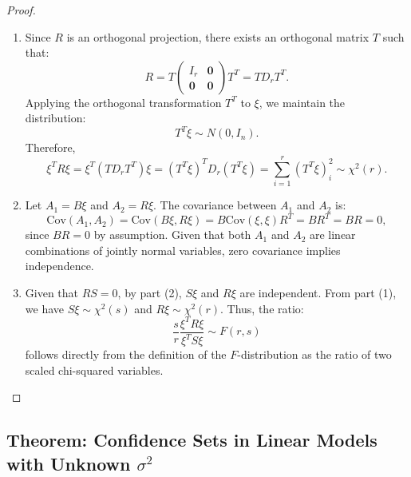 \documentclass[open=any, 11pt,paper=A4]{scrreprt}
\begin{document}
\begin{proof}
\begin{enumerate}
    \item 
    Since \(R\) is an orthogonal projection, there exists an orthogonal matrix \(T\) such that:
    \[
    R = T \begin{pmatrix} I_r & \mathbf{0} \\ \mathbf{0} & \mathbf{0} \end{pmatrix} T^T = T D_r T^T.
    \]
    Applying the orthogonal transformation \(T^T\) to \(\xi\), we maintain the distribution:
    \[
    T^T \xi \sim N(0, I_n).
    \]
    Therefore,
    \[
    \xi^T R \xi = \xi^T (T D_r T^T) \xi = (T^T \xi)^T D_r (T^T \xi) = \sum_{i=1}^{r} (T^T \xi)_i^2 \sim \chi^2(r).
    \]
    
    \item 
    Let \(A_1 = B\xi\) and \(A_2 = R\xi\). The covariance between \(A_1\) and \(A_2\) is:
    \[
    \text{Cov}(A_1, A_2) = \text{Cov}(B\xi, R\xi) = B \text{Cov}(\xi, \xi) R^T = BR^T = BR = 0,
    \]
    since \(BR = 0\) by assumption. Given that both \(A_1\) and \(A_2\) are linear combinations of jointly normal variables, zero covariance implies independence.
    
    \item 
    Given that \(RS = 0\), by part (2), \(S\xi\) and \(R\xi\) are independent. From part (1), we have \(S\xi \sim \chi^2(s)\) and \(R\xi \sim \chi^2(r)\). Thus, the ratio:
    \[
    \frac{s}{r} \frac{\xi^T R \xi}{\xi^T S \xi} \sim F(r, s)
    \]
    follows directly from the definition of the \(F\)-distribution as the ratio of two scaled chi-squared variables.
\end{enumerate}
\end{proof}

\subsection*{Theorem: Confidence Sets in Linear Models with Unknown \(\sigma^2\)}
\end{document}
